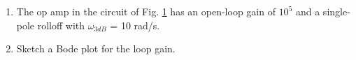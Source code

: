 \begin{enumerate}[label=\thesection.\arabic*.,ref=\thesection.\theenumi]
\item The op amp in the circuit of Fig. \ref{fig:ee18btech11028_2_q}
has an open-loop gain of $10^{5}$ and a single-pole rolloff with
$\omega_{3dB}$ = 10 rad/s.

\renewcommand{\thefigure}{\theenumi.\arabic{figure}}
%
\begin{figure}[!ht]
	\begin{center}
		\resizebox{\columnwidth}{!}{}
	\end{center}
\caption{}
\label{fig:ee18btech11028_2_q}
\end{figure}
%
\begin{table}[!ht]
    \centering
    
    \caption{}
    \label{table:ee18btech11028_2_parameters}
\end{table}
\item Sketch a Bode plot for the loop gain.


\end{enumerate}